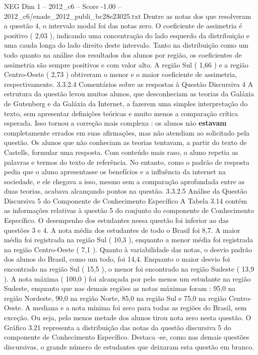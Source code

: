 \begin{textsample}{NEG Dim 1 – 2012\_c6 – Score -1.00 – 2012\_c6/enade\_2012\_publi\_bc28e23025.txt}
Dentre as notas dos que resolveram a questão 4, o intervalo modal foi das notas zero.
O coeficiente de assimetria é positivo ( 2,03 ), indicando uma concentração do lado esquerdo da distribuição e uma cauda longa do lado direito deste intervalo.
Tanto na distribuição como um todo quanto na análise dos resultados dos alunos por região, os coeficientes de assimetria são sempre positivos e com valor alto.
A região Sul ( 1,66 ) e a região Centro-Oeste ( 2,73 ) obtiveram o menor e o maior coeficiente de assimetria, respectivamente. 3.3.2.4 Comentários sobre as respostas à Questão Discursiva 4 A estrutura da questão levou muitos alunos, que desconheciam as teorias da Galáxia de Gutenberg e da Galáxia da Internet, a fazerem uma simples interpretação do texto, sem apresentar definições teóricas e muito menos a comparação crítica esperada.
Isso tornou a correção mais complexa : os alunos não \textbf{estavam} completamente errados em suas afirmações, mas não atendiam ao solicitado pela questão.
Os alunos que não conheciam as teorias tentavam, a partir do texto de Castells, formular uma resposta.
Com conteúdo mais raso, o aluno repetia as palavras e termos do texto de referência.
No entanto, como o padrão de resposta pedia que o aluno apresentasse os benefícios e a influência da internet na sociedade, e ele chegava a isso, mesmo sem a comparação aprofundada entre as duas teorias, acabava alcançando pontos na questão. 3.3.2.5 Análise da Questão Discursiva 5 do Componente de Conhecimento Específico A Tabela 3.14 contém as informações relativas à questão 5 do conjunto do componente de Conhecimento Específico.
O desempenho dos estudantes nessa questão foi inferior ao das questões 3 e 4.
A nota média dos estudantes de todo o Brasil foi 8,7.
A maior média foi registrada na região Sul ( 10,3 ), enquanto a menor média foi registrada na região Centro-Oeste ( 7,1 ).
Quanto à variabilidade das notas, o desvio padrão dos alunos do Brasil, como um todo, foi 14,4.
Enquanto o maior desvio foi encontrado na região Sul ( 15,5 ), o menor foi encontrado na região Sudeste ( 13,9 ).
A nota máxima ( 100,0 ) foi alcançada por pelo menos um estudante na região Sudeste, enquanto que nas demais regiões as notas máximas foram : 95,0 na região Nordeste, 90,0 na região Norte, 85,0 na região Sul e 75,0 na região Centro-Oeste.
A mediana e a nota mínima foi zero para todas as regiões do Brasil, sem exceção.
Ou seja, pelo menos metade dos alunos tirou nota zero nesta questão.
O Gráfico 3.21 representa a distribuição das notas da questão discursiva 5 do componente de Conhecimento Específico.
Destaca -se, como nas demais questões discursivas, o grande número de estudantes que deixaram esta questão em branco.

\end{textsample}
